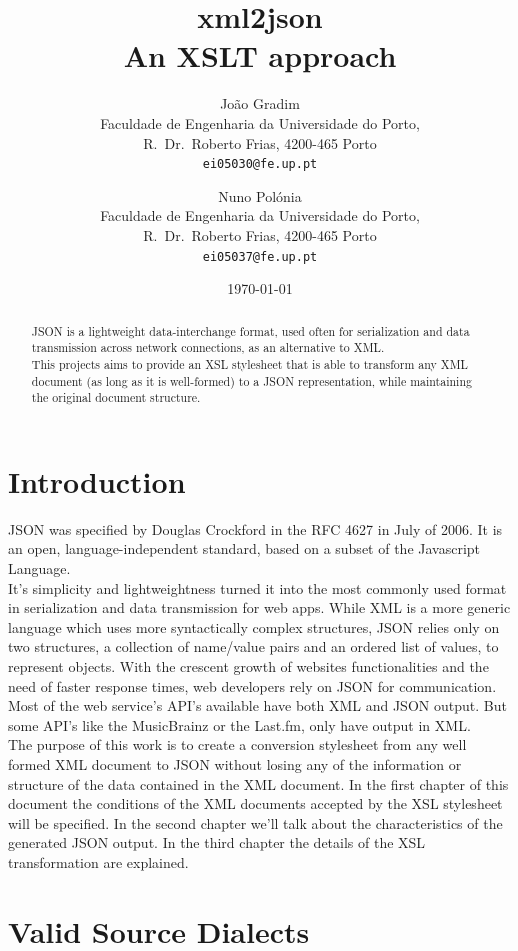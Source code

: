 \documentclass[twocolumn,twoside,10pt,a4paper]{article}
\title{xml2json\\\footnotesize{An XSLT approach}}
\author{João Gradim\\
\small Faculdade de Engenharia da Universidade do Porto,\\[-0.8ex]
\small R.\ Dr.\ Roberto Frias, 4200-465 Porto\\[-0.8ex]
\small \texttt{ei05030@fe.up.pt}\\
\and
Nuno Polónia\\
\small Faculdade de Engenharia da Universidade do Porto,\\[-0.8ex]
\small R.\ Dr.\ Roberto Frias, 4200-465 Porto\\[-0.8ex]
\small \texttt{ei05037@fe.up.pt}
}
\date{\today}
\begin{document}
\maketitle
\thispagestyle{plain}

\begin{abstract}

JSON is a lightweight data-interchange format, used often for serialization and data transmission across network connections, as an alternative to XML\cite{json_format}.\\
This projects aims to provide an XSL stylesheet that is able to transform any XML document (as long as it is well-formed) to a JSON representation, while maintaining the original document structure.

\end{abstract}
\section{Introduction}\label{sec:intro}


JSON was specified by Douglas Crockford in the RFC 4627 in July of 2006\cite{rfc4627}. It is an open, language-independent standard, based on a subset of the Javascript Language.\\
It's simplicity and lightweightness turned it into the most commonly used format in serialization and data transmission for web apps. While XML is a more generic language which uses more syntactically complex structures, JSON relies only on two structures, a collection of name/value pairs and an ordered list of values\cite{json_format}, to represent objects.
With the crescent growth of websites functionalities and the need of faster response times, web developers rely on JSON for communication. Most of the web service's API's available have both XML and JSON output. But some API's like the MusicBrainz or the Last.fm, only have output in XML.\\
The purpose of this work is to create a conversion stylesheet from any well formed XML document to JSON without losing any of the information or structure of the data contained in the XML document. In the first chapter of this document the conditions of the XML documents accepted by the XSL stylesheet will be specified. In the second chapter we'll talk about the characteristics of the generated JSON output. In the third chapter the details of the XSL transformation are explained.

\section{Valid Source Dialects}\label{sec:valid-source-dialects}
\end{document}
